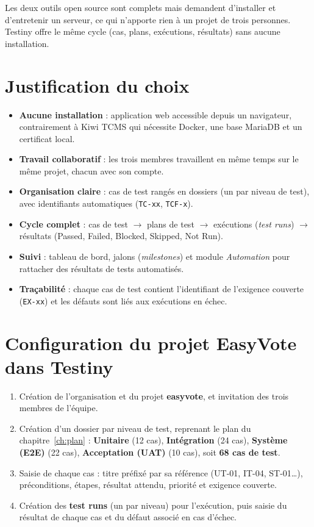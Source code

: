 \documentclass[12pt,a4paper]{report}
\begin{document}
Les deux outils open source sont complets mais demandent d'installer et d'entretenir un serveur, ce qui n'apporte rien à un projet de trois personnes. Testiny offre le même cycle (cas, plans, exécutions, résultats) sans aucune installation.

\section{Justification du choix}
\begin{itemize}
  \item \textbf{Aucune installation} : application web accessible depuis un navigateur, contrairement à Kiwi TCMS qui nécessite Docker, une base MariaDB et un certificat local.
  \item \textbf{Travail collaboratif} : les trois membres travaillent en même temps sur le même projet, chacun avec son compte.
  \item \textbf{Organisation claire} : cas de test rangés en dossiers (un par niveau de test), avec identifiants automatiques (\texttt{TC-xx}, \texttt{TCF-x}).
  \item \textbf{Cycle complet} : cas de test $\rightarrow$ plans de test $\rightarrow$ exécutions (\textit{test runs}) $\rightarrow$ résultats (Passed, Failed, Blocked, Skipped, Not Run).
  \item \textbf{Suivi} : tableau de bord, jalons (\textit{milestones}) et module \textit{Automation} pour rattacher des résultats de tests automatisés.
  \item \textbf{Traçabilité} : chaque cas de test contient l'identifiant de l'exigence couverte (\texttt{EX-xx}) et les défauts sont liés aux exécutions en échec.
\end{itemize}

\section{Configuration du projet EasyVote dans Testiny}
\begin{enumerate}
  \item Création de l'organisation et du projet \textbf{easyvote}, et invitation des trois membres de l'équipe.
  \item Création d'un dossier par niveau de test, reprenant le plan du chapitre~\ref{ch:plan} : \textbf{Unitaire} (12 cas), \textbf{Intégration} (24 cas), \textbf{Système (E2E)} (22 cas), \textbf{Acceptation (UAT)} (10 cas), soit \textbf{68 cas de test}.
  \item Saisie de chaque cas : titre préfixé par sa référence (UT-01, IT-04, ST-01\ldots), préconditions, étapes, résultat attendu, priorité et exigence couverte.
  \item Création des \textbf{test runs} (un par niveau) pour l'exécution, puis saisie du résultat de chaque cas et du défaut associé en cas d'échec.
\end{enumerate}
\end{document}
